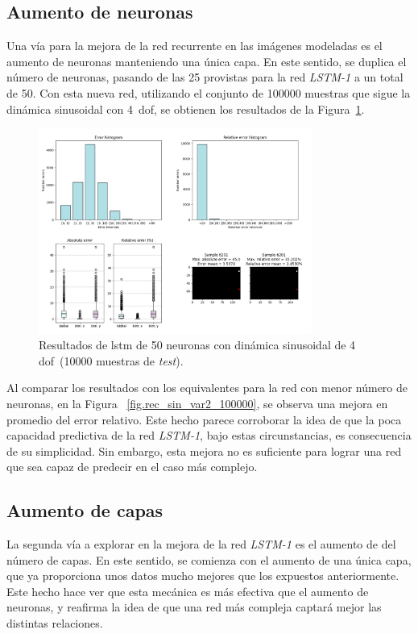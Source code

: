\subsection{Aumento de neuronas}
Una vía para la mejora de la red recurrente en las imágenes modeladas es el aumento de neuronas manteniendo una única capa. En este sentido, se duplica el número de neuronas, pasando de las 25 provistas para la red \textit{LSTM-1} a un total de 50. Con esta nueva red, utilizando el conjunto de 100000 muestras que sigue la dinámica sinusoidal con 4~\acrshort{dof}, se obtienen los resultados de la Figura~\ref{fig.units_rec_sin_var2_100000}.

\begin{figure}[H]
		\begin{center}
			\includegraphics[width=0.8\textwidth]{ figures/test_mod/REC/complex/units_sin_var2_100000.png}
			\caption{Resultados de \acrshort{lstm} de 50 neuronas con dinámica sinusoidal de 4 \acrshort{dof}~(10000 muestras de \textit{test}).}
			\label{fig.units_rec_sin_var2_100000}
		\end{center}
\end{figure}
\vspace{-10pt}

Al comparar los resultados con los equivalentes para la red con menor número de neuronas, en la Figura ~\ref{fig.rec_sin_var2_100000}, se observa una mejora en promedio del error relativo. Este hecho parece corroborar la idea de que la poca capacidad predictiva de la red \textit{LSTM-1}, bajo estas circunstancias, es consecuencia de su simplicidad. Sin embargo, esta mejora no es suficiente para lograr una red que sea capaz de predecir en el caso más complejo.

\subsection{Aumento de capas} \label{ap.capas_mod}
La segunda vía a explorar en la mejora de la red \textit{LSTM-1} es el aumento de del número de capas. En este sentido, se comienza con el aumento de una única capa, que ya proporciona unos datos mucho mejores que los expuestos anteriormente. Este hecho hace ver que esta mecánica es más efectiva que el aumento de neuronas, y reafirma la idea de que una red más compleja captará mejor las distintas relaciones.\\

